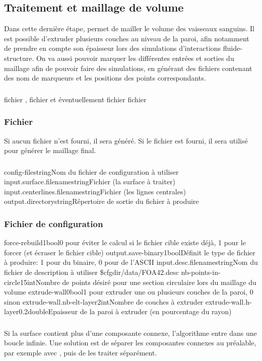 	\subsection{Traitement et maillage de volume}

Dans cette dernière étape,  permet de mailler le volume des vaisseaux sanguins. Il est possible d'extruder plusieurs couches au niveau de la paroi, afin notamment de prendre en compte son épaisseur lors des simulations d'interactions fluide-structure. On va aussi pouvoir marquer les différentes entrées et sorties du maillage afin de pouvoir faire des simulations, en générant des fichiers \desc contenant des nom de marqueurs et les positions des points correspondants.

	\subsubsection{\ioT}
	
\iolist
{fichier \stl, fichier \vtk et éventuellement fichier \desc}
{fichier \msh}

\subsubsection{Fichier \desc}

Si aucun fichier \desc n'est fourni, il sera généré. Si le fichier est fourni, il sera utilisé pour générer le maillage final.
	
	\subsubsection{\argsT}

\args
{config-file}{}{string}{Nom du fichier de configuration à utiliser}
{input.surface.filename}{}{string}{Fichier \stl (la surface à traiter)}
{input.centerlines.filename}{}{string}{Fichier \vtk (les lignes centrales)}
{output.directory}{}{string}{Répertoire de sortie du fichier \stl à produire}
\stoparg

		\subsubsection{Fichier de configuration}

\configfile
{force-rebuild}{1}{bool}{0 pour éviter le calcul si le fichier cible existe déjà, 1 pour le forcer (et écraser le fichier cible)}
{output.save-binary}{1}{bool}{Définit le type de fichier \msh à produire: 1 pour du binaire, 0 pour de l'ASCII}
{input.desc.filename}{}{string}{Nom du fichier de description à utiliser \$cfgdir/data/FOA42.desc}
{nb-points-in-circle}{15}{int}{Nombre de points désiré pour une section circulaire lors du maillage du volume}
{extrude-wall}{0}{bool}{1 pour extruder une ou plusieurs couches de la paroi, 0 sinon}
{extrude-wall.nb-elt-layer}{2}{int}{Nombre de couches à extruder}
{extrude-wall.h-layer}{0.2}{double}{Epaisseur de la paroi à extruder (en pourcentage du rayon)}
\stopfile

	\subsubsection{\etatg}
	
Si la surface contient plus d'une composante connexe, l'algorithme entre dans une boucle infinie. Une solution est de séparer les composantes connexes au préalable, par exemple avec \paraview, puis de les traiter séparément.


